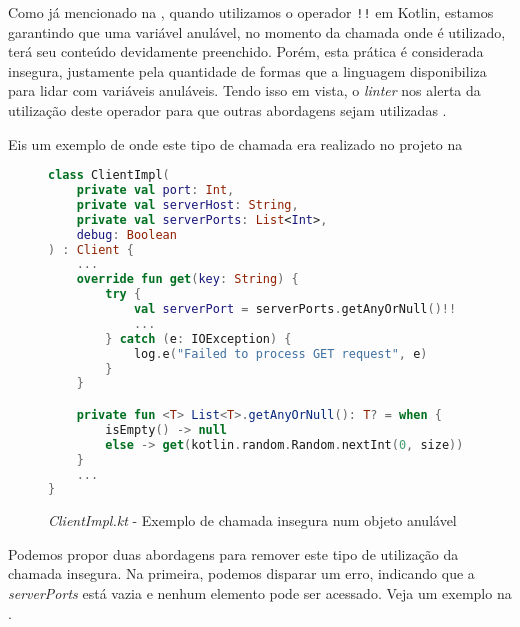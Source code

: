 Como já mencionado na , quando utilizamos o operador \verb|!!| em Kotlin, estamos garantindo que uma variável anulável, no momento da chamada onde é utilizado, terá seu conteúdo devidamente preenchido. Porém, esta prática é considerada insegura, justamente pela quantidade de formas que a linguagem disponibiliza para lidar com variáveis anuláveis. Tendo isso em vista, o \textit{linter} nos alerta da utilização deste operador para que outras abordagens sejam utilizadas \cite{detekt_unsafe_call_on_nullable_rule}.

Eis um exemplo de onde este tipo de chamada era realizado no projeto na 

\begin{figure}[H]
    \centering
    \begin{lstlisting}[language=Kotlin]
class ClientImpl(
    private val port: Int,
    private val serverHost: String,
    private val serverPorts: List<Int>,
    debug: Boolean
) : Client {
    ...
    override fun get(key: String) {
        try {
            val serverPort = serverPorts.getAnyOrNull()!!
            ...
        } catch (e: IOException) {
            log.e("Failed to process GET request", e)
        }
    }

    private fun <T> List<T>.getAnyOrNull(): T? = when {
        isEmpty() -> null
        else -> get(kotlin.random.Random.nextInt(0, size))
    }
    ...
}
    \end{lstlisting}
    \caption{\textit{ClientImpl.kt} - Exemplo de chamada insegura num objeto anulável}
    \label{fig:detekt_unsafe_null_call_on_nullable_before_example}
\end{figure}

Podemos propor duas abordagens para remover este tipo de utilização da chamada insegura. Na primeira, podemos disparar um erro, indicando que a \textit{serverPorts} está vazia e nenhum elemento pode ser acessado. Veja um exemplo na .

